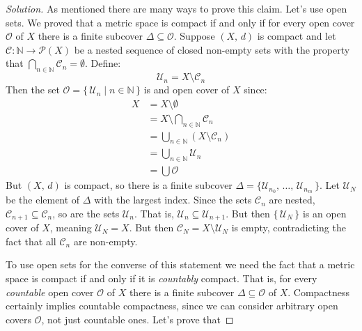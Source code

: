 \documentclass{article}
\theoremstyle{normal}
\begin{document}
\begin{proof}[Solution]
        As mentioned there are many ways to prove this claim. Let's use
        open sets. We proved that a metric space is compact if and only if
        for every open cover $\mathcal{O}$ of $X$ there is a finite subcover
        $\Delta\subseteq\mathcal{O}$. Suppose $(X,\,d)$ is compact and let
        $\mathcal{C}:\mathbb{N}\rightarrow\mathcal{P}(X)$ be a nested sequence
        of closed non-empty sets with the property that
        $\bigcap_{n\in\mathbb{N}}\mathcal{C}_{n}=\emptyset$. Define:
        \begin{equation}
            \mathcal{U}_{n}=X\setminus\mathcal{C}_{n}
        \end{equation}
        Then the set $\mathcal{O}=\{\,\mathcal{U}_{n}\;|\;n\in\mathbb{N}\,\}$ is
        and open cover of $X$ since:
        \begin{align}
            X&=X\setminus\emptyset\\
            &=X\setminus\bigcap_{n\in\mathbb{N}}\mathcal{C}_{n}\\
            &=\bigcup_{n\in\mathbb{N}}(X\setminus\mathcal{C}_{n})\\
            &=\bigcup_{n\in\mathbb{N}}\mathcal{U}_{n}\\
            &=\bigcup\mathcal{O}
        \end{align}
        But $(X,\,d)$ is compact, so there is a finite subcover
        $\Delta=\{\mathcal{U}_{n_{0}},\,\dots,\,\mathcal{U}_{n_{m}}\,\}$.
        Let $\mathcal{U}_{N}$ be the element of $\Delta$ with the largest
        index. Since the sets $\mathcal{C}_{n}$ are nested,
        $\mathcal{C}_{n+1}\subseteq\mathcal{C}_{n}$, so are the sets
        $\mathcal{U}_{n}$. That is,
        $\mathcal{U}_{n}\subseteq\mathcal{U}_{n+1}$. But then
        $\{\,\mathcal{U}_{N}\,\}$ is an open cover of $X$, meaning
        $\mathcal{U}_{N}=X$. But then
        $\mathcal{C}_{N}=X\setminus\mathcal{U}_{N}$ is empty, contradicting
        the fact that all $\mathcal{C}_{n}$ are non-empty.
        \par\hfill\par
        To use open sets for the converse of this statement we need the fact
        that a metric space is compact if and only if it is
        \textit{countably} compact. That is, for every
        \textit{countable} open cover $\mathcal{O}$ of $X$ there is a finite
        subcover $\Delta\subseteq\mathcal{O}$ of $X$. Compactness certainly
        implies countable compactness, since we can consider arbitrary open
        covers $\mathcal{O}$, not just countable ones. Let's prove that

\end{proof}
\end{document}
